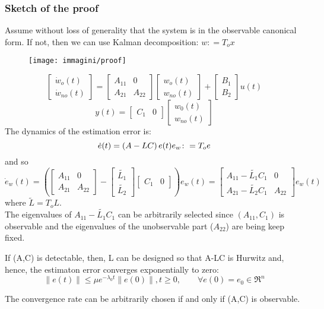 \subsubsection{Sketch of the proof}
Assume without loss of generality that the system is in the observable canonical form. If not, then we can use Kalman decomposition:  $w\colon=T_ox$
\begin{figure}[H]
	\centering
	\texttt{[image: immagini/proof]}
	\label{fig:proof}
\end{figure}
\[\begin{bmatrix}
	\dot{w}_o(t)\\
	\dot{w}_{no}(t)
\end{bmatrix}
=\begin{bmatrix}
	A_{11} & 0\\A_{21} & A_{22}
\end{bmatrix}\begin{bmatrix}
w_o(t)\\w_{no}(t)
\end{bmatrix}
+\begin{bmatrix}
	B_1\\B_2
\end{bmatrix}u(t)
\]
\[
y(t)=\begin{bmatrix}
	C_1 & 0
\end{bmatrix}\begin{bmatrix}
w_0(t)\\w_{no}(t)
\end{bmatrix}
\]
The dynamics of the estimation error is:
\[
\dot{e}(t)=\left(A-LC\right)e(t)\\
e_w\colon=T_oe
\]
and so
\[
\dot{e}_w(t)=\left( \begin{bmatrix}
	A_{11} & 0\\A_{21} & A_{22}
\end{bmatrix}-\begin{bmatrix}
	\tilde{L_1} \\ \tilde{L_2}
\end{bmatrix} \begin{bmatrix}
C_1 & 0
\end{bmatrix}\right) e_w(t)=\begin{bmatrix}
	\boxed{A_{11}-\tilde{L_1}C_1} & 0\\
	A_{21}-\tilde{L_2}C_1 & \boxed{A_{22}}
\end{bmatrix} e_w(t)
\]
where $\tilde{L}=T_oL$.\\
The eigenvalues of $A_{11}-\tilde{L_1}C_1$ can be arbitrarily selected since $\left( A_{11},C_1\right)$ is observable and the eigenvalues of the unobservable part ($A_{22}$) are being keep fixed.
\begin{thm}
	If (A,C) is detectable, then, L can be designed so that A-LC is Hurwitz and, hence, the estimaton error converges exponentially to zero:
	\[
		\|e(t)\| \le \mu e^{-\lambda_0t}\|e(0)\|, t\ge 0, \qquad \forall e(0)=e_0 \in \Re^n
	\]
\end{thm}
\begin{remark}
	The convergence rate can be arbitrarily chosen if and only if (A,C) is observable.
\end{remark}
